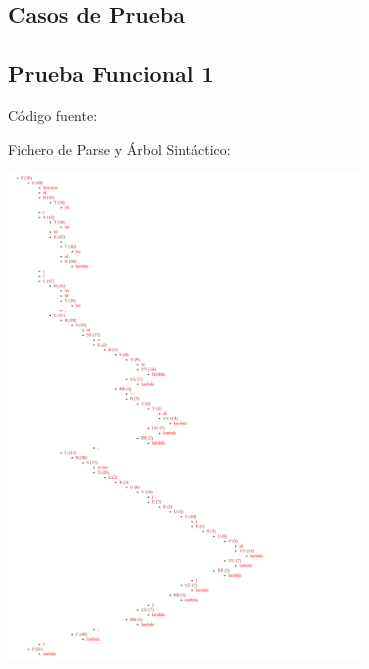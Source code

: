 \documentclass{article}[a4paper]
\begin{document}
\newpage
\begin{appendices}

\section{Casos de Prueba}

\subsection{Prueba Funcional 1}
Código fuente:

\hspace{\parindent} Fichero de Parse y Árbol Sintáctico:

\includegraphics[width=0.7\textwidth]{arbol1.png}


\end{appendices}
\end{document}
